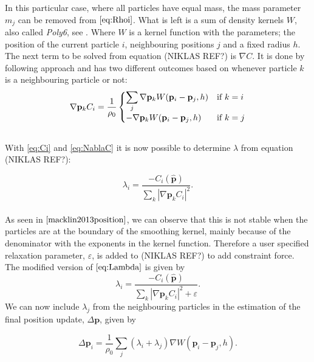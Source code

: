 In this particular case, where all particles have equal mass, the mass parameter $m_j$ can be removed from $\ref{eq:Rhoi}$. What is left is a sum of density kernels $W$, also called \textit{Poly6}, see \cite{macklin2013position}. Where $W$ is a kernel function with the parameters; the position of the current particle  $i$, neighbouring positions $j$ and a fixed radius $h$.
\\
The next term to be solved from equation (NIKLAS REF?) is $\nabla C$. It is done by following \cite{macklin2013position} approach and has two different outcomes based on whenever particle $k$ is a neighbouring particle or not:
\\
\begin{equation}
 \nabla \mathbf{p}_k C_i = \frac{1}{\rho_0}
  \begin{cases}
  \label{eq:NablaC} 
   \displaystyle \sum\limits_{j} \nabla \mathbf{p}_k W(\mathbf{p}_i - \mathbf{p}_j, h) & $\text{if }$ k = i \\
   - \nabla \mathbf{p}_k W(\mathbf{p}_i - \mathbf{p}_j, h) & $\text{if }$ k = j \\
  \end{cases}
\end{equation}
\\
With \ref{eq:Ci} and \ref{eq:NablaC} it is now possible to determine $\lambda$ from equation (NIKLAS REF?):

\begin{equation}
\label{eq:Lambda}
\lambda_i = \frac{- C_i(\hat{\mathbf{p}}) }{ \sum\limits_{k} |\nabla \mathbf{p}_k C_i|^2 }.
\end{equation}
\\
As seen in $\cite{macklin2013position}$, we can observe that this is not stable when the particles are at the boundary of the smoothing kernel, mainly because of the denominator with the exponents in the kernel function. Therefore a user specified relaxation parameter, $\varepsilon$, is added to (NIKLAS REF?) to add constraint force. The modified version of $\ref{eq:Lambda}$ is given by
\begin{equation}
\label{eq:LambdaEpsilon}
\lambda_i = \frac{- C_i(\hat{\mathbf{p}}) }{ \sum\limits_{k} |\nabla \mathbf{p}_k C_i|^2 + \varepsilon}.
\end{equation}
We can now include $\lambda_j$ from the neighbouring particles in the estimation of the final position update, $\Delta \mathbf{p}$, given by

\begin{equation}
\label{eq:DeltaP}
\Delta \mathbf{p}_i = \frac{1}{\rho_0} \sum\limits_{j} (\lambda_i + \lambda_j) \nabla W(\mathbf{p}_i - \mathbf{p}_j, h).
\end{equation}

